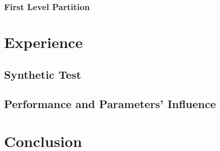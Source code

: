 \documentclass[runningheads]{llncs}
\begin{document}
\subsubsection{First Level Partition}


\section{Experience}
\subsection{Synthetic Test}
\subsection{Performance and Parameters' Influence}

\section{Conclusion}
\newpage



\end{document}
